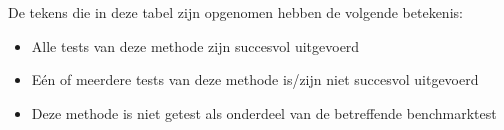 De tekens die in deze tabel zijn opgenomen hebben de volgende betekenis:
\begin{itemize}
   \item[\cmark] Alle tests van deze methode zijn succesvol uitgevoerd
   \item[\xmark] E\'en of meerdere tests van deze methode is/zijn niet succesvol uitgevoerd
   \item[\nmark] Deze methode is niet getest als onderdeel van de betreffende benchmarktest
\end{itemize}
